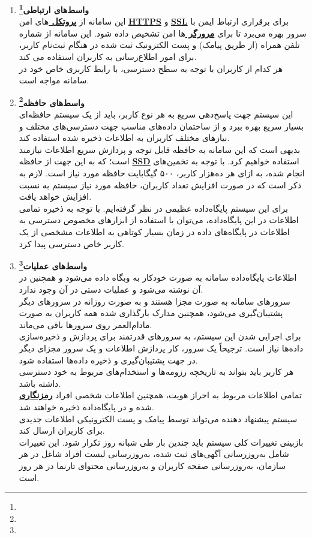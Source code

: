 \documentclass[12pt]{article}
\begin{document}
\begin{enumerate}
		\item
		\textbf{واسط‌های ارتباطی\footnote{}}\\
		این سامانه از \textbf{\hyperref[ref:protocol]{پروتکل }}‌های امن \textbf{\hyperref[ref:https]{HTTPS}} و \textbf{\hyperref[ref:ssl]{SSL}} برای برقراری ارتباط ایمن با سرور بهره می‌برد تا برای \textbf{\hyperref[ref:browser]{مرورگر }}ها امن تشخیص داده شود. این سامانه از شماره تلفن همراه (از طریق پیامک) و پست الکترونیک ثبت شده در هنگام ثبت‌نام کاربر، برای امور اطلاع‌‌رسانی به کاربران استفاده می کند.\\
		هر کدام از کاربران با توجه به سطح دسترسی، با رابط کاربری خاص خود در سامانه مواجه است.

		\item
		\textbf{واسط‌های حافظه\footnote{}}\\
		این سیستم جهت پاسخ‌دهی سریع به هر نوع کاربر، باید از یک سیستم حافظه‌ای بسیار سریع بهره ببرد و از ساختمان داده‌های مناسب جهت دسترسی‌های مختلف و نیازهای مختلف کاربران به اطلاعات ذخیره شده استفاده کند.\\
		بدیهی است که این سامانه به حافظه قابل توجه و پردازش سريع اطلاعات نیازمند است؛ که به این جهت از حافظه \textbf{\hyperref[ref:ssd]{SSD}} استفاده خواهیم کرد. با توجه به تخمین‌های انجام شده، به ازای هر ده‌هزار کاربر، ۵۰۰ گیگابایت حافظه مورد نیاز است. لازم به ذکر است که در صورت افزایش تعداد کاربران، حافظه‌ مورد نیاز سیستم به نسبت افزایش خواهد یافت.\\
		برای این سیستم پایگاه‌داده عظیمی در نظر گرفته‌ایم. با توجه به ذخیره تمامی اطلاعات در این پایگاه‌‌داده، می‌توان با استفاده از ابزار‌های مخصوص دسترسی به اطلاعات در پایگاه‌های داده در زمان بسیار کوتاهی به اطلاعات مشخصی از یک کاربر خاص دسترسی پیدا کرد.
		\item
		\textbf{واسط‌های عملیات\footnote{}}\\
		اطلاعات پایگاه‌داده سامانه به صورت خودکار به وبگاه داده می‌شود و همچنین در آن نوشته می‌شود و عملیات دستی در آن وجود ندارد.\\
		سرورهای سامانه به صورت مجزا هستند و به صورت روزانه در سرورهای دیگر پشتیبان‌گیری می‌شود، همچنین مدارک بارگذاری شده همه کاربران به صورت مادام‌العمر روی سرور‌ها باقی می‌ماند.\\
		برای اجرایی شدن این سیستم، به سرورهای قدرتمند برای پردازش و ذخیره‌سازی داده‌ها نیاز است. ترجیحاً یک سرور، کار پردازش اطلاعات و یک سرور مجزای دیگر در جهت پشتیبان‌گیری و ذخیره داده‌ها استفاده شود.\\
		هر کاربر باید بتواند به تاریخچه رزومه‌ها و استخدام‌های مربوط به خود دسترسی داشته باشد.\\
		تمامی اطلاعات مربوط به احراز هویت، همچنین اطلاعات شخصی افراد \textbf{\hyperref[ref:enc]{رمزنگاری}} شده و در پایگاه‌داده ذخیره خواهند شد.\\
		سیستم پیشنهاد دهنده می‌تواند توسط پیامک و پست الکترونیکی اطلاعات جدیدی برای کاربران ارسال کند.\\
		بازبینی تغییرات کلی سیستم باید چندین بار طی شبانه روز تکرار شود. این تغییرات شامل به‌روزرسانی آگهی‌های ثبت شده، به‌روزرسانی لیست افراد شاغل در هر سازمان، به‌روزرسانی صفحه کاربران و به‌روزرسانی محتوای تارنما در هر روز است.


\end{enumerate}
\end{document}
